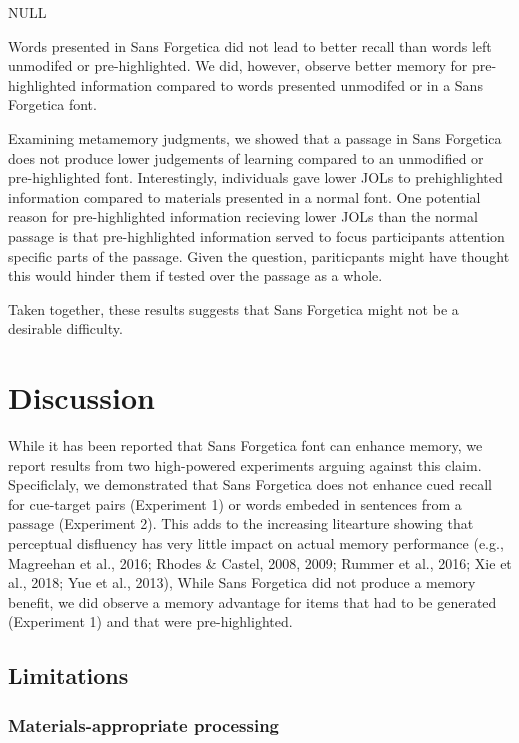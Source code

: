 \documentclass[doc]{apa6}
\begin{document}
NULL

Words presented in Sans Forgetica did not lead to better recall than words left unmodifed or pre-highlighted. We did, however, observe better memory for pre-highlighted information compared to words presented unmodifed or in a Sans Forgetica font.

Examining metamemory judgments, we showed that a passage in Sans Forgetica does not produce lower judgements of learning compared to an unmodified or pre-highlighted font. Interestingly, individuals gave lower JOLs to prehighlighted information compared to materials presented in a normal font. One potential reason for pre-highlighted information recieving lower JOLs than the normal passage is that pre-highlighted information served to focus participants attention specific parts of the passage. Given the question, pariticpants might have thought this would hinder them if tested over the passage as a whole.

Taken together, these results suggests that Sans Forgetica might not be a desirable difficulty.

\hypertarget{discussion}{%
\section{Discussion}\label{discussion}}

While it has been reported that Sans Forgetica font can enhance memory, we report results from two high-powered experiments arguing against this claim. Specificlaly, we demonstrated that Sans Forgetica does not enhance cued recall for cue-target pairs (Experiment 1) or words embeded in sentences from a passage (Experiment 2). This adds to the increasing litearture showing that perceptual disfluency has very little impact on actual memory performance (e.g., Magreehan et al., 2016; Rhodes \& Castel, 2008, 2009; Rummer et al., 2016; Xie et al., 2018; Yue et al., 2013), While Sans Forgetica did not produce a memory benefit, we did observe a memory advantage for items that had to be generated (Experiment 1) and that were pre-highlighted.

\hypertarget{limitations}{%
\subsection{Limitations}\label{limitations}}

\hypertarget{materials-appropriate-processing}{%
\subsubsection{Materials-appropriate processing}\label{materials-appropriate-processing}}
\end{document}
